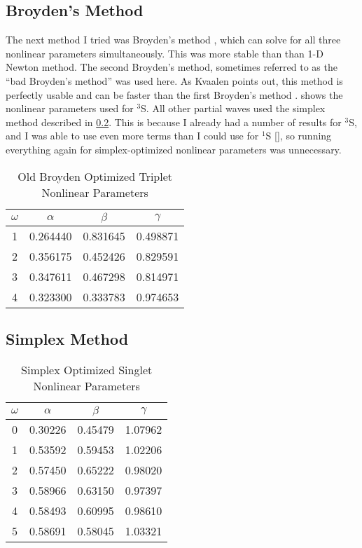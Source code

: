\documentclass[Dissertation.tex]{subfiles}
\begin{document}
\subsection{Broyden's Method}
\label{sec:Broyden}
The next method I tried was Broyden's method \cite{Sauer2006}, which can solve for all three nonlinear parameters simultaneously. This was more stable than than 1-D Newton method. The second Broyden's method, sometimes referred to as the ``bad Broyden's method'' was used here. As Kvaalen points out, this method is perfectly usable and can be faster than the first Broyden's method \cite{Kvaalen1991}.  shows the nonlinear parameters used for $^3$S. All other partial waves used the simplex method described in \cref{sec:Simplex}. This is because I already had a number of results for $^3$S, and I was able to use even more terms than I could use for $^1$S \ref{}, so running everything again for simplex-optimized nonlinear parameters was unnecessary.

\setlength{\abovecaptionskip}{6pt}   %
\setlength{\belowcaptionskip}{6pt}   %
\begin{table}[H]
\caption{Old Broyden Optimized Triplet Nonlinear Parameters}
\centering
\begin{tabular}{c c c c}
\hline\hline
$\omega$ & $\alpha$ & $\beta$ & $\gamma$ \\ [0.5ex]
\hline
1 & 0.264440 & 0.831645 & 0.498871 \\
2 & 0.356175 & 0.452426 & 0.829591 \\
3 & 0.347611 & 0.467298 & 0.814971 \\
4 & 0.323300 & 0.333783 & 0.974653 \\
\hline\hline
\end{tabular}
\label{table:NonlinearOptimized3SBroyden}
\end{table}

\subsection{Simplex Method}
\label{sec:Simplex}

\setlength{\abovecaptionskip}{6pt}   %
\setlength{\belowcaptionskip}{6pt}   %
\begin{table}[H]
\caption{Simplex Optimized Singlet Nonlinear Parameters}
\centering
\begin{tabular}{c c c c}
\hline\hline
$\omega$ & $\alpha$ & $\beta$ & $\gamma$ \\ [0.5ex]
\hline
0 & 0.30226 & 0.45479 & 1.07962 \\
1 & 0.53592 & 0.59453 & 1.02206 \\
2 & 0.57450 & 0.65222 & 0.98020 \\
3 & 0.58966 & 0.63150 & 0.97397 \\
4 & 0.58493 & 0.60995 & 0.98610 \\
5 & 0.58691 & 0.58045 & 1.03321 \\
\hline\hline
\end{tabular}
\label{tab:NonlinearOptimized1SSimplex}
\end{table}
\end{document}
